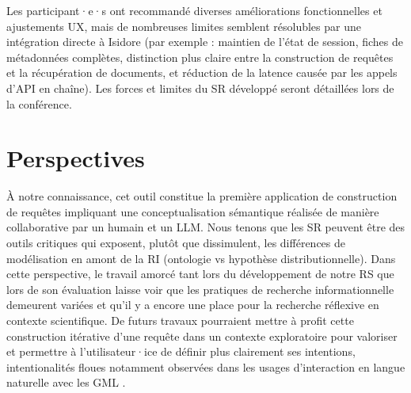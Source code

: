 \documentclass[final,fra]{anthology-ch} %
\begin{document}
Les participant·e·s ont recommandé diverses améliorations fonctionnelles
et ajustements UX, mais de nombreuses limites semblent résolubles par
une intégration directe à Isidore (par exemple : maintien de l'état de
session, fiches de métadonnées complètes, distinction plus claire entre
la construction de requêtes et la récupération de documents, et
réduction de la latence causée par les appels d'API en chaîne). Les
forces et limites du SR développé seront détaillées lors de la
conférence.

\section{Perspectives}\label{perspectives}

À notre connaissance, cet outil constitue la première application de
construction de requêtes impliquant une conceptualisation sémantique
réalisée de manière collaborative par un humain et un LLM. Nous tenons
que les SR peuvent être des outils critiques qui exposent, plutôt que
dissimulent, les différences de modélisation en amont de la RI
(ontologie vs hypothèse distributionnelle). Dans cette perspective, le
travail amorcé tant lors du développement de notre RS que lors de son
évaluation laisse voir que les pratiques de recherche informationnelle
demeurent variées et qu'il y a encore une place pour la recherche
réflexive en contexte scientifique. De futurs travaux pourraient mettre
à profit cette construction itérative d'une requête dans un contexte
exploratoire pour valoriser et permettre à l'utilisateur·ice de définir
plus clairement ses intentions, intentionalités floues notamment
observées dans les usages d'interaction en langue naturelle avec les GML
\autocite{subramonyamBridgingGulfEnvisioning2024}.


\printbibliography




\end{document}
